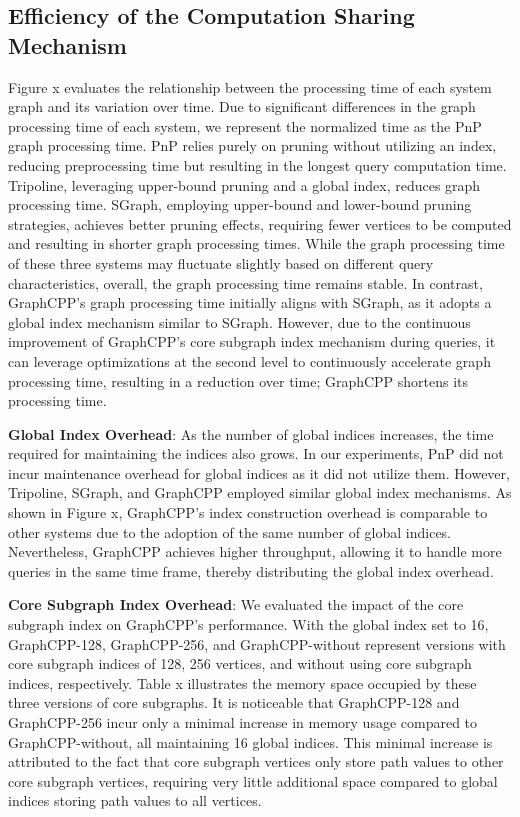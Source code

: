 \documentclass[lettersize,journal]{IEEEtran} %
\begin{document}
\subsection{Efficiency of the Computation Sharing Mechanism}
Figure x evaluates the relationship between the processing time of each system graph and its variation over time. Due to significant differences in the graph processing time of each system, we represent the normalized time as the PnP graph processing time. PnP relies purely on pruning without utilizing an index, reducing preprocessing time but resulting in the longest query computation time. Tripoline, leveraging upper-bound pruning and a global index, reduces graph processing time. SGraph\cite{sgraph}, employing upper-bound and lower-bound pruning strategies, achieves better pruning effects, requiring fewer vertices to be computed and resulting in shorter graph processing times. While the graph processing time of these three systems may fluctuate slightly based on different query characteristics, overall, the graph processing time remains stable. In contrast, GraphCPP's graph processing time initially aligns with SGraph, as it adopts a global index mechanism similar to SGraph. However, due to the continuous improvement of GraphCPP's core subgraph index mechanism during queries, it can leverage optimizations at the second level to continuously accelerate graph processing time, resulting in a reduction over time; GraphCPP shortens its processing time.

{\bf{Global Index Overhead}}: As the number of global indices increases, the time required for maintaining the indices also grows. In our experiments, PnP did not incur maintenance overhead for global indices as it did not utilize them. However, Tripoline, SGraph\cite{sgraph}, and GraphCPP employed similar global index mechanisms. As shown in Figure x, GraphCPP's index construction overhead is comparable to other systems due to the adoption of the same number of global indices. Nevertheless, GraphCPP achieves higher throughput, allowing it to handle more queries in the same time frame, thereby distributing the global index overhead.

{\bf{Core Subgraph Index Overhead}}: We evaluated the impact of the core subgraph index on GraphCPP's performance. With the global index set to 16, GraphCPP-128, GraphCPP-256, and GraphCPP-without represent versions with core subgraph indices of 128, 256 vertices, and without using core subgraph indices, respectively. Table x illustrates the memory space occupied by these three versions of core subgraphs. It is noticeable that GraphCPP-128 and GraphCPP-256 incur only a minimal increase in memory usage compared to GraphCPP-without, all maintaining 16 global indices. This minimal increase is attributed to the fact that core subgraph vertices only store path values to other core subgraph vertices, requiring very little additional space compared to global indices storing path values to all vertices.
\end{document}
